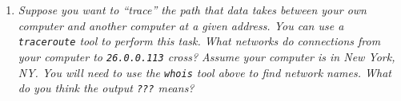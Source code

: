 \documentclass[11pt]{article}
\begin{document}
\begin{enumerate}

	\item \emph{Suppose you want to ``trace'' the path that data takes between your own computer and another computer at a given address. You can use a \texttt{traceroute} tool to perform this task. What networks do connections from your computer to \texttt{26.0.0.113} cross? Assume your computer is in New York, NY. You will need to use the \texttt{whois} tool above to find network names. What do you think the output \texttt{???} means?}
	
\end{enumerate}
\end{document}
